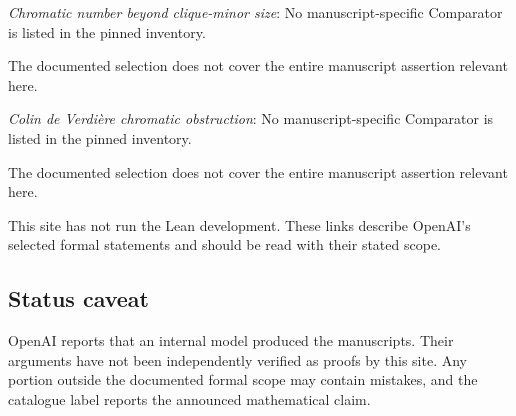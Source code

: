 \documentclass[11pt]{article}
\begin{document}
\textit{Chromatic number beyond clique-minor size}: No manuscript-specific Comparator is listed in the pinned inventory.

The documented selection does not cover the entire manuscript assertion relevant here.

\textit{Colin de Verdière chromatic obstruction}: No manuscript-specific Comparator is listed in the pinned inventory.

The documented selection does not cover the entire manuscript assertion relevant here.

This site has not run the Lean development. These links describe OpenAI’s selected formal statements and should be read with their stated scope.

\subsection{Status caveat}
OpenAI reports that an internal model produced the manuscripts. Their arguments have not been independently verified as proofs by this site. Any portion outside the documented formal scope may contain mistakes, and the catalogue label reports the announced mathematical claim.
\end{document}
